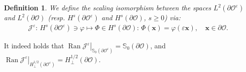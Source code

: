 \documentclass[]{article}
\newtheorem{definition}{Definition}
\numberwithin{equation}{section}
\numberwithin{theorem}{section}
\numberwithin{lemma}{section}
\numberwithin{corollary}{section}
\numberwithin{proposition}{section}
\numberwithin{definition}{section}
\newcommand{\re}{\varepsilon}
\renewcommand{\O}{\mathcal{O}}
\renewcommand{\vec}{\boldsymbol}
\begin{document}
\begin{appendices}
		\begin{definition}
			\label{def:isomorphism}
			We define the scaling isomorphism between the spaces $L^2(\partial\O^{\re})$ and $L^2(\partial\O)$  (resp. $H^s(\partial\O^{\re})$ and $H^s(\partial\O)$, $s\geq 0$) via:
			\begin{align*}%
				\mathcal{J}^{\re}:\, H^s(\partial\O^{\re})\ni\varphi\mapsto\Phi\in H^s(\partial\O): \, \Phi(\vec{x})=\varphi(\re\vec{x}), \quad \vec{x}\in \partial\O.
			\end{align*}
		\end{definition}
		It indeed holds that $\operatorname{Ran} \left.\mathcal{J}^{\re}\right|_{\mathbb{S}_0(\partial\O^{\re})}=\mathbb{S}_0(\partial\O)$, and $\operatorname{Ran} \left.\mathcal{J}^{\re}\right|_{H^{1/2}_{\perp}(\partial\O^{\re})}=H^{1/2}_{\perp}(\partial\O)$.
		

\end{appendices}
\end{document}
